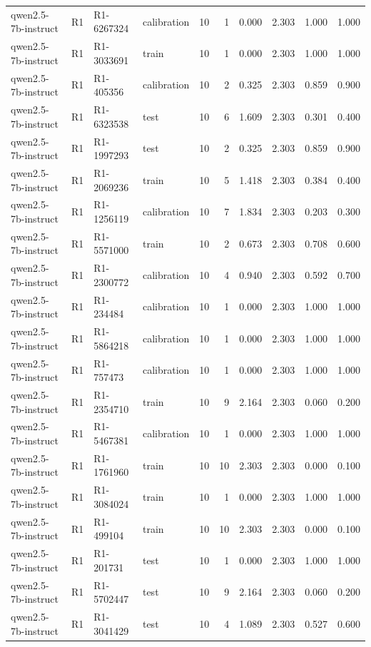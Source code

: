 \begin{table}
\begin{tabular}{llllrrrrrr}
qwen2.5-7b-instruct & R1 & R1-6267324 & calibration & 10 & 1 & 0.000 & 2.303 & 1.000 & 1.000 \\
qwen2.5-7b-instruct & R1 & R1-3033691 & train & 10 & 1 & 0.000 & 2.303 & 1.000 & 1.000 \\
qwen2.5-7b-instruct & R1 & R1-405356 & calibration & 10 & 2 & 0.325 & 2.303 & 0.859 & 0.900 \\
qwen2.5-7b-instruct & R1 & R1-6323538 & test & 10 & 6 & 1.609 & 2.303 & 0.301 & 0.400 \\
qwen2.5-7b-instruct & R1 & R1-1997293 & test & 10 & 2 & 0.325 & 2.303 & 0.859 & 0.900 \\
qwen2.5-7b-instruct & R1 & R1-2069236 & train & 10 & 5 & 1.418 & 2.303 & 0.384 & 0.400 \\
qwen2.5-7b-instruct & R1 & R1-1256119 & calibration & 10 & 7 & 1.834 & 2.303 & 0.203 & 0.300 \\
qwen2.5-7b-instruct & R1 & R1-5571000 & train & 10 & 2 & 0.673 & 2.303 & 0.708 & 0.600 \\
qwen2.5-7b-instruct & R1 & R1-2300772 & calibration & 10 & 4 & 0.940 & 2.303 & 0.592 & 0.700 \\
qwen2.5-7b-instruct & R1 & R1-234484 & calibration & 10 & 1 & 0.000 & 2.303 & 1.000 & 1.000 \\
qwen2.5-7b-instruct & R1 & R1-5864218 & calibration & 10 & 1 & 0.000 & 2.303 & 1.000 & 1.000 \\
qwen2.5-7b-instruct & R1 & R1-757473 & calibration & 10 & 1 & 0.000 & 2.303 & 1.000 & 1.000 \\
qwen2.5-7b-instruct & R1 & R1-2354710 & train & 10 & 9 & 2.164 & 2.303 & 0.060 & 0.200 \\
qwen2.5-7b-instruct & R1 & R1-5467381 & calibration & 10 & 1 & 0.000 & 2.303 & 1.000 & 1.000 \\
qwen2.5-7b-instruct & R1 & R1-1761960 & train & 10 & 10 & 2.303 & 2.303 & 0.000 & 0.100 \\
qwen2.5-7b-instruct & R1 & R1-3084024 & train & 10 & 1 & 0.000 & 2.303 & 1.000 & 1.000 \\
qwen2.5-7b-instruct & R1 & R1-499104 & train & 10 & 10 & 2.303 & 2.303 & 0.000 & 0.100 \\
qwen2.5-7b-instruct & R1 & R1-201731 & test & 10 & 1 & 0.000 & 2.303 & 1.000 & 1.000 \\
qwen2.5-7b-instruct & R1 & R1-5702447 & test & 10 & 9 & 2.164 & 2.303 & 0.060 & 0.200 \\
qwen2.5-7b-instruct & R1 & R1-3041429 & test & 10 & 4 & 1.089 & 2.303 & 0.527 & 0.600 \\

\end{tabular}
\end{table}
